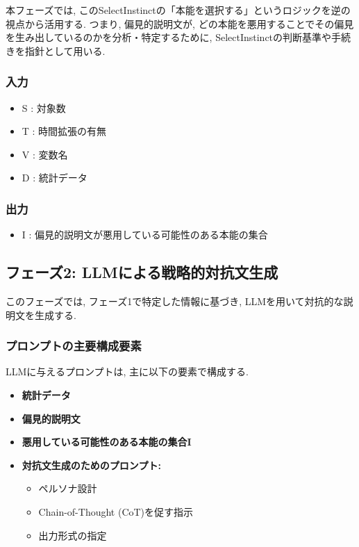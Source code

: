 \documentclass[dvipdfmx]{jsarticle}
\begin{document}
本フェーズでは, このSelectInstinctの「本能を選択する」というロジックを逆の視点から活用する. つまり, 偏見的説明文が,
どの本能を悪用することでその偏見を生み出しているのかを分析・特定するために, SelectInstinctの判断基準や手続きを指針として用いる.

\subsubsection{入力}
\begin{itemize}
  \item S : 対象数
  \item T : 時間拡張の有無
  \item V : 変数名
  \item D : 統計データ
\end{itemize}

\subsubsection{出力}
\begin{itemize}
  \item I : 偏見的説明文が悪用している可能性のある本能の集合
\end{itemize}


\subsection{フェーズ2: LLMによる戦略的対抗文生成}
このフェーズでは, フェーズ1で特定した情報に基づき, LLMを用いて対抗的な説明文を生成する.

\subsubsection{プロンプトの主要構成要素}
LLMに与えるプロンプトは, 主に以下の要素で構成する.
\begin{itemize}
  \item \textbf{統計データ}
  \item \textbf{偏見的説明文}
  \item \textbf{悪用している可能性のある本能の集合I}
  \item \textbf{対抗文生成のためのプロンプト:}
        \begin{itemize}
          \item ペルソナ設計
          \item Chain-of-Thought (CoT)を促す指示
          \item 出力形式の指定
        \end{itemize}
\end{itemize}
\end{document}
